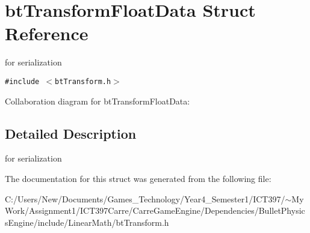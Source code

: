 \hypertarget{structbt_transform_float_data}{
\section{btTransformFloatData Struct Reference}
\label{structbt_transform_float_data}
}
for serialization  


{\tt \#include $<$btTransform.h$>$}

Collaboration diagram for btTransformFloatData:

\subsection{Detailed Description}
for serialization 

The documentation for this struct was generated from the following file:\begin{CompactItemize}
\item 
C:/Users/New/Documents/Games\_\-Technology/Year4\_\-Semester1/ICT397/$\sim$My Work/Assignment1/ICT397Carre/CarreGameEngine/Dependencies/BulletPhysicsEngine/include/LinearMath/btTransform.h\end{CompactItemize}
